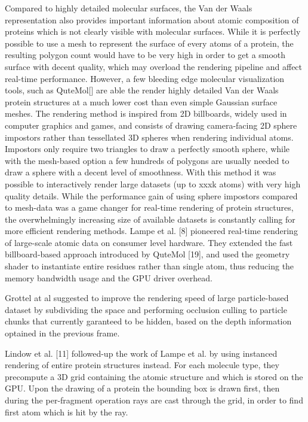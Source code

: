 Compared to highly detailed molecular surfaces, the Van der Waals representation also provides important information about atomic composition of proteins which is not clearly visible with molecular surfaces.
While it is perfectly possible to use a mesh to represent the surface of every atoms of a protein, the resulting polygon count would have to be very high in order to get a smooth surface with decent quality, which may overload the rendering pipeline and affect real-time performance.
However, a few bleeding edge molecular visualization tools, such as QuteMol[] are able the render highly detailed Van der Waals protein structures at a much lower cost than even simple Gaussian surface meshes.
The rendering method is inspired from 2D billboards, widely used in computer graphics and games, and consists of drawing camera-facing 2D sphere impostors rather than tessellated 3D spheres when rendering individual atoms.
Impostors only require two triangles to draw a perfectly smooth sphere, while with the mesh-based option a few hundreds of polygons are usually needed to draw a sphere with a decent level of smoothness.
With this method it was possible to interactively render large datasets (up to xxxk atoms) with very high quality details.
While the performance gain of using sphere impostors compared to mesh-data was a game changer for real-time rendering of protein structures, the overwhelmingly increasing size of available datasets is constantly calling for more efficient rendering methods.
Lampe et al. [8] pioneered real-time rendering of large-scale atomic data on consumer level hardware. 
They extended the fast billboard-based approach introduced by QuteMol [19], and used the geometry shader to instantiate entire residues rather than single atom, thus reducing the memory bandwidth usage and the GPU driver overhead. 

Grottel at al suggested to improve the rendering speed of large particle-based dataset by subdividing the space and performing occlusion culling to particle chunks that currently garanteed to be hidden, based on the depth information optained in the previous frame.

Lindow et al. [11] followed-up the work of Lampe et al. by using instanced rendering of entire protein structures instead. 
For each molecule type, they precompute a 3D grid containing the atomic structure and which is stored on the GPU.
Upon the drawing of a protein the bounding box is drawn first, then during the per-fragment operation rays are cast through the grid, in order to find first atom which is hit by the ray.

